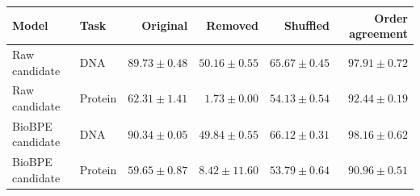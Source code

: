 \begin{tabular}{llrrrr}
\toprule
Model & Task & Original & Removed & Shuffled & Order agreement \\
\midrule
Raw candidate & DNA & $89.73 \pm 0.48$ & $50.16 \pm 0.55$ & $65.67 \pm 0.45$ & $97.91 \pm 0.72$ \\
Raw candidate & Protein & $62.31 \pm 1.41$ & $1.73 \pm 0.00$ & $54.13 \pm 0.54$ & $92.44 \pm 0.19$ \\
BioBPE candidate & DNA & $90.34 \pm 0.05$ & $49.84 \pm 0.55$ & $66.12 \pm 0.31$ & $98.16 \pm 0.62$ \\
BioBPE candidate & Protein & $59.65 \pm 0.87$ & $8.42 \pm 11.60$ & $53.79 \pm 0.64$ & $90.96 \pm 0.51$ \\
\bottomrule
\end{tabular}

